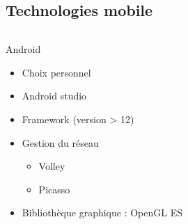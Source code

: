 \documentclass{beamer} %
\begin{document}
  \subsection{Technologies mobile}
  \begin{frame}{\subsecname}
  \begin{columns}
    \begin{column}{0.62\textwidth}
      \begin{block}{Android}
        \begin{itemize}
          \item Choix personnel
          \item Android studio
          \item Framework (version > 12)
          \item Gestion du réseau
          \begin{itemize}
            \item Volley
            \item Picasso
          \end{itemize}
          \item Bibliothèque graphique : OpenGL ES
        \end{itemize}
      \end{block}
      

\end{column}
\end{columns}
\end{frame}
\end{document}
